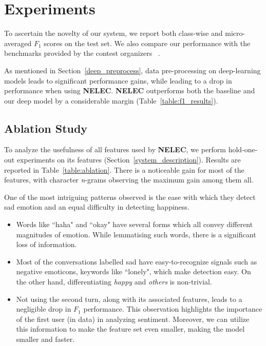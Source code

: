 \documentclass[11pt,a4paper]{article}
\begin{document}
\section{Experiments}

To ascertain the novelty of our system, we report both class-wise and micro-averaged $F_{1}$ scores on the test set. We also compare our performance with the benchmarks provided by the contest organizers ~\cite{chatterjee2019understanding}.

As mentioned in Section~\ref{deep_preprocess}, data pre-processing on deep-learning models leads to significant performance gains, while leading to a drop in performance when using \textbf{NELEC}. \textbf{NELEC} outperforms both the baseline and our deep model by a considerable margin (Table~\ref{table:f1_results}).

\subsection{Ablation Study}

To analyze the usefulness of all features used by \textbf{NELEC}, we perform hold-one-out experiments on its features (Section~\ref{system_description}). Results are reported in Table~\ref{table:ablation}. There is a noticeable gain for most of the features, with character \textit{n}-grams observing the maximum gain among them all.

One of the most intriguing patterns observed is the ease with which they detect sad emotion and an equal difficulty in detecting happiness.
\begin{itemize}
    \item Words like ``haha" and ``okay" have several forms which all convey different magnitudes of emotion. While lemmatising such words, there is a significant loss of information.
    \item Most of the conversations labelled sad have easy-to-recognize signals such as negative emoticons, keywords like ``lonely", which make detection easy. On the other hand, differentiating \textit{happy} and \textit{others} is non-trivial.
    \item Not using the second turn, along with its associated features, leads to a negligible drop in $F_{1}$ performance. This observation highlights the importance of the first user (in data) in analyzing sentiment. Moreover, we can utilize this information to make the feature set even smaller, making the model smaller and faster.
\end{itemize}
\end{document}
